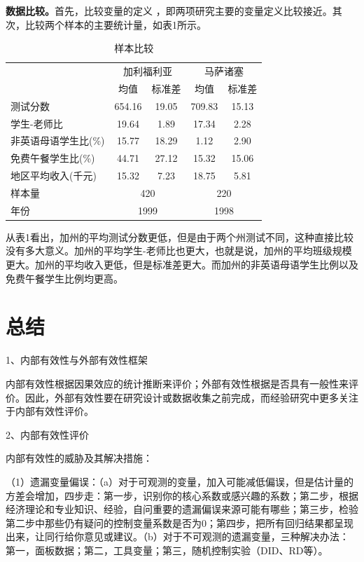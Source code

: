\documentclass[cn,12pt,math=newtx,citestyle=gb7714-2015,bibstyle=gb7714-2015]{elegantbook}
\begin{document}
\textbf{数据比较。}首先，比较变量的定义 ，即两项研究主要的变量定义比较接近。其次，比较两个样本的主要统计量，如表1所示。
\begin{center}
	\begin{table}[!h]
		\caption{样本比较}\label{tab:digit}
		\begin{center}
			\begin{tabular}{lcccc}
				\hline
				&\multicolumn{2}{c}{加利福利亚}&\multicolumn{2}{c}{马萨诸塞}\\
				\cline{2-5}
				&均值&标准差&均值&标准差\\
				\cline{1-5}
				测试分数&654.16&19.05&709.83&15.13\\
				学生-老师比&19.64&1.89&17.34&2.28\\
				非英语母语学生比(\%)&15.77&18.29&1.12&2.90\\
				免费午餐学生比(\%)&44.71&27.12&15.32&15.06\\
				地区平均收入(千元)&15.32&7.23&18.75&5.81\\
				样本量&\multicolumn{2}{c}{420}&\multicolumn{2}{c}{220}\\
				年份&\multicolumn{2}{c}{1999}&\multicolumn{2}{c}{1998}\\
				\hline
			\end{tabular}
		\end{center}
	\end{table}
\end{center}

从表1看出，加州的平均测试分数更低，但是由于两个州测试不同，这种直接比较没有多大意义。加州的平均学生-老师比也更大，也就是说，加州的平均班级规模更大。加州的平均收入更低，但是标准差更大。而加州的非英语母语学生比例以及免费午餐学生比例均更高。


\section{总结}
1、内部有效性与外部有效性框架

内部有效性根据因果效应的统计推断来评价；外部有效性根据是否具有一般性来评价。因此，外部有效性要在研究设计或数据收集之前完成，而经验研究中更多关注于内部有效性评价。

2、内部有效性评价

内部有效性的威胁及其解决措施：

（1）遗漏变量偏误：（a）对于可观测的变量，加入可能减低偏误，但是估计量的方差会增加，四步走：第一步，识别你的核心系数或感兴趣的系数；第二步，根据经济理论和专业知识、经验，自问重要的遗漏偏误来源可能有哪些；第三步，检验第二步中那些仍有疑问的控制变量系数是否为0；第四步，把所有回归结果都呈现出来，让同行给你意见或建议。（b）对于不可观测的遗漏变量，三种解决办法：第一，面板数据；第二，工具变量；第三，随机控制实验（DID、RD等）。
\end{document}
